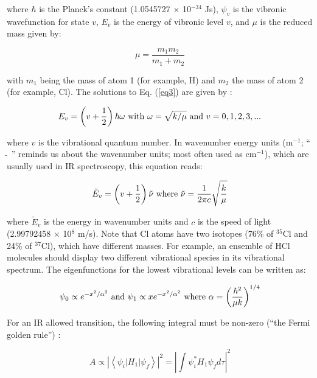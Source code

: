 \documentclass[byrevtex,amssymb,aps,pra,floatfix,letterpaper]{revtex4}
\begin{document}
\noindent
where $\hbar$ is the Planck's constant (1.0545727 $\times$ 10$^{-34}$ Js), $\psi_v$ is the vibronic wavefunction for state $v$, $E_v$ is the energy of vibronic level $v$, and $\mu$ is the reduced mass given by:

\begin{equation}
\mu = \frac{m_1 m_2}{m_1 + m_2}
\label{eq4}
\end{equation}

\noindent
with $m_1$ being the mass of atom 1 (for example, H) and $m_2$ the mass of atom 2 (for example, Cl). The solutions to Eq. (\ref{eq3}) are given by \cite{ATKINS1,HERZBERG1}:

\begin{equation}
E_v = \left(v + \frac{1}{2}\right)\hbar\omega\textnormal{ with }\omega = \sqrt{k/\mu}\textnormal{ and }v = 0,1,2,3,...
\label{eq5}
\end{equation}

\noindent
where $v$ is the vibrational quantum number. In wavenumber energy units (m$^{-1}$; `` $\tilde{~}$ '' reminds us about the wavenumber units; most often used as cm$^{-1}$), which are usually used in IR spectroscopy, this equation reads:

\begin{equation}
\tilde{E}_v = \left(v + \frac{1}{2}\right)\tilde{\nu}\textnormal{ where }\tilde{\nu} = \frac{1}{2\pi c}\sqrt{\frac{k}{\mu}}
\label{eq6}
\end{equation}

\noindent
where $\tilde{E}_v$ is the energy in wavenumber units and $c$ is the speed of light (2.99792458 $\times$ 10$^8$ m/s). Note that Cl atoms have two isotopes (76\% of $^{35}$Cl and 24\% of $^{37}$Cl), which have different masses. For example, an ensemble of HCl molecules should display two different vibrational species in its vibrational spectrum. The eigenfunctions for the lowest vibrational levels can be written as:

\begin{equation}
\psi_0 \propto e^{-x^2/\alpha^2}\textnormal{ and }\psi_1 \propto xe^{-x^2/\alpha^2}\textnormal{ where }\alpha = \left(\frac{\hbar^2}{\mu k}\right)^{1/4}
\label{eq7}
\end{equation}

\noindent
For an IR allowed transition, the following integral must be non-zero (``the Fermi golden rule'') \cite{ATKINS2}:

\begin{equation}
A \propto \left|\left<\psi_i\left|H_1\right|\psi_f\right>\right|^2 = \left|\int\psi_i^*H_1\psi_fd\tau\right|^2
\label{eq8}
\end{equation}
\end{document}

